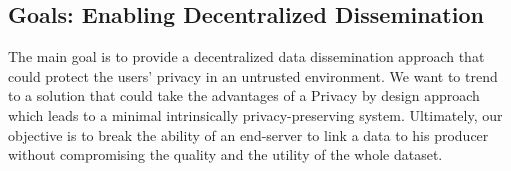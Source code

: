 
\subsection{Goals: Enabling Decentralized Dissemination}

The main goal is to provide a decentralized data dissemination approach that could protect the users' privacy in an untrusted environment.
We want to trend to a solution that could take the advantages of a Privacy by design approach which leads to a minimal intrinsically privacy-preserving system.
Ultimately, our objective is to break the ability of an end-server to link a data to his producer without compromising the quality and the utility of the whole dataset.


